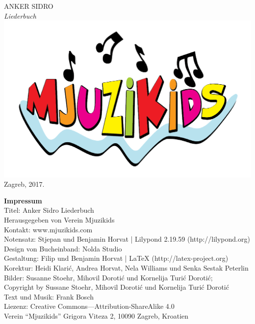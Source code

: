 \documentclass[a4paper,twoside, svgnames]{article}
\newcommand{\impresspac}{7pt}
\newcommand*{\titleTH}{\begingroup
\vspace*{5cm}
\begin{center}
{{\fontsize{50}{60}\selectfont
\textsf{\textcolor{anker}{ANKER} \textcolor{sidro}{SIDRO}}}}\\
\vspace*{0.3cm}
{\fontsize{69}{80}\selectfont
\itshape\textrm{Liederbuch}}
\vfill %
\includegraphics[width=0.2\linewidth]{images/mjuzikids_logo}\\
\vspace*{0.5cm}
{Zagreb, 2017.}\par %
\end{center}
\endgroup}
\begin{document}
\thispagestyle {empty}
\titleTH

\newpage
\thispagestyle {empty}
\begin{center}
\vspace*{\fill}
\begin{onehalfspacing}
\textbf{\textsf{Impressum}}\\
\vspace{10pt}
Titel: Anker Sidro Liederbuch\\
\vspace{\impresspac}
Herausgegeben von Verein Mjuzikids\\
\vspace{\impresspac}
Kontakt: www.mjuzikids.com\\
\vspace{\impresspac}
Notensatz: Stjepan und Benjamin Horvat | Lilypond 2.19.59 (http://lilypond.org)\\
\vspace{\impresspac}
Design von Bucheinband: Nolda Studio\\
\vspace{\impresspac}
Gestaltung: Filip und Benjamin Horvat | LaTeX (http://latex-project.org) \\
\vspace{\impresspac}
Korektur: Heidi Klarić, Andrea Horvat, Nela Williams und Senka Sestak Peterlin\\
\vspace{\impresspac}
Bilder: Susanne Stoehr, Mihovil Dorotić und Kornelija Turić Dorotić;\\
Copyright by Sussane Stoehr, Mihovil Dorotić und Kornelija Turić Dorotić\\
\vspace{\impresspac}
Text und Musik: Frank Bosch\\
\vspace{\impresspac}
Liezenz: Creative Commons—Attribution-ShareAlike 4.0\\
\vspace{\impresspac}
Verein “Mjuzikids” Grigora Viteza 2, 10090 Zagreb, Kroatien\\
\vspace{\impresspac}
\vspace{\impresspac}

\end{onehalfspacing}
\end{center}
\end{document}
